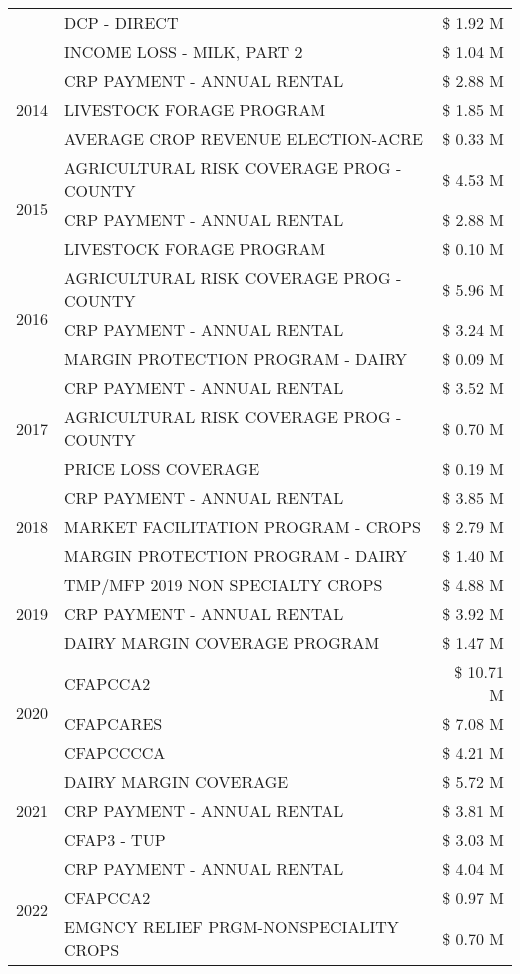 \begin{tabular}{llr}
 & DCP - DIRECT & \$ 1.92 M \\
 & INCOME LOSS - MILK, PART 2 & \$ 1.04 M \\
\cline{1-3}
\multirow[t]{3}{*}{2014} & CRP PAYMENT - ANNUAL RENTAL & \$ 2.88 M \\
 & LIVESTOCK FORAGE PROGRAM & \$ 1.85 M \\
 & AVERAGE CROP REVENUE ELECTION-ACRE & \$ 0.33 M \\
\cline{1-3}
\multirow[t]{3}{*}{2015} & AGRICULTURAL RISK COVERAGE PROG - COUNTY & \$ 4.53 M \\
 & CRP PAYMENT - ANNUAL RENTAL & \$ 2.88 M \\
 & LIVESTOCK FORAGE PROGRAM & \$ 0.10 M \\
\cline{1-3}
\multirow[t]{3}{*}{2016} & AGRICULTURAL RISK COVERAGE PROG - COUNTY & \$ 5.96 M \\
 & CRP PAYMENT - ANNUAL RENTAL & \$ 3.24 M \\
 & MARGIN PROTECTION PROGRAM - DAIRY & \$ 0.09 M \\
\cline{1-3}
\multirow[t]{3}{*}{2017} & CRP PAYMENT - ANNUAL RENTAL & \$ 3.52 M \\
 & AGRICULTURAL RISK COVERAGE PROG - COUNTY & \$ 0.70 M \\
 & PRICE LOSS COVERAGE & \$ 0.19 M \\
\cline{1-3}
\multirow[t]{3}{*}{2018} & CRP PAYMENT - ANNUAL RENTAL & \$ 3.85 M \\
 & MARKET FACILITATION PROGRAM - CROPS & \$ 2.79 M \\
 & MARGIN PROTECTION PROGRAM - DAIRY & \$ 1.40 M \\
\cline{1-3}
\multirow[t]{3}{*}{2019} & TMP/MFP 2019 NON SPECIALTY CROPS & \$ 4.88 M \\
 & CRP PAYMENT - ANNUAL RENTAL & \$ 3.92 M \\
 & DAIRY MARGIN COVERAGE PROGRAM & \$ 1.47 M \\
\cline{1-3}
\multirow[t]{3}{*}{2020} & CFAPCCA2 & \$ 10.71 M \\
 & CFAPCARES & \$ 7.08 M \\
 & CFAPCCCCA & \$ 4.21 M \\
\cline{1-3}
\multirow[t]{3}{*}{2021} & DAIRY MARGIN COVERAGE & \$ 5.72 M \\
 & CRP PAYMENT - ANNUAL RENTAL & \$ 3.81 M \\
 & CFAP3 - TUP & \$ 3.03 M \\
\cline{1-3}
\multirow[t]{3}{*}{2022} & CRP PAYMENT - ANNUAL RENTAL & \$ 4.04 M \\
 & CFAPCCA2 & \$ 0.97 M \\
 & EMGNCY RELIEF PRGM-NONSPECIALITY CROPS & \$ 0.70 M \\
\cline{1-3}
\bottomrule
\end{tabular}
